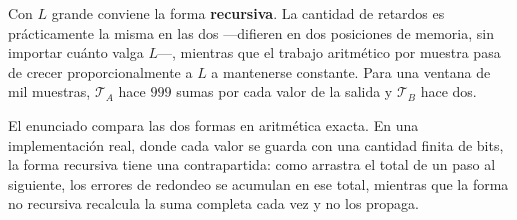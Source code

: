 \documentclass[10pt,a4paper]{article}
\begin{document}
\begin{enumerate}
		Con $L$ grande conviene la forma \textbf{recursiva}. La cantidad de retardos es
		prácticamente la misma en las dos ---difieren en dos posiciones de memoria, sin
		importar cuánto valga $L$---, mientras que el trabajo aritmético por muestra pasa de
		crecer proporcionalmente a $L$ a mantenerse constante. Para una ventana de mil
		muestras, $\mathcal{T}_A$ hace $999$ sumas por cada valor de la salida y
		$\mathcal{T}_B$ hace dos.

		El enunciado compara las dos formas en aritmética exacta. En una implementación real,
		donde cada valor se guarda con una cantidad finita de bits, la forma recursiva tiene
		una contrapartida: como arrastra el total de un paso al siguiente, los errores de
		redondeo se acumulan en ese total, mientras que la forma no recursiva recalcula la
		suma completa cada vez y no los propaga.
	\end{enumerate}
\end{document}
